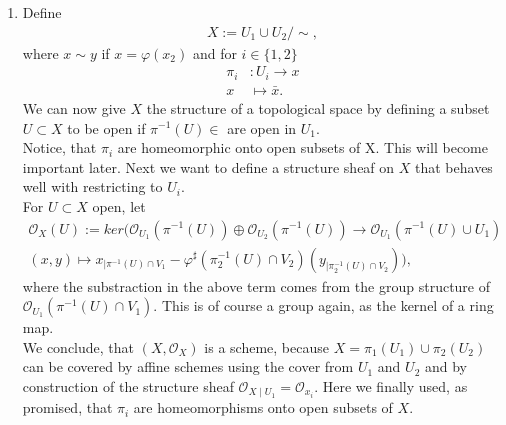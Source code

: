 \newcommand{\sheet}{5}




\maketitle{}

\begin{exercise}{1}
    \begin{enumerate}
        \item Define 
        \begin{align*}
            X:=U_1\cup U_2/\!{\sim},
        \end{align*}
        where $x\sim y$ if $x=\varphi(x_2)$ and for $i\in \lbrace
        1,2\rbrace$
        \begin{align*}
            \pi_i&:U_i\to x\\
            x&\mapsto \bar{x}.
        \end{align*}
        We can now give $X$ the structure of a topological 
        space by defining a subset $U\subset X$ to be open
        if $\pi^{-1}(U)\in$ are open in $U_1$.\\
        Notice, that $\pi_i$ are homeomorphic onto open subsets
        of X. This will become important later.
        Next we want to define a structure sheaf on $X$ that
        behaves well with restricting to $U_i.$\\
        For $U\subset X$ open, let 
        \begin{align*}
            \mathcal{O}_X(U):=ker(\mathcal{O}_{U_1}(\pi^{-1}(U))\oplus \mathcal{O}_{U_2}(\pi^{-1}(U)) \to \mathcal{O}_{U_1}(\pi^{-1}(U) \cup U_1)\\
            (x,y) \mapsto x_{\mid \pi^{-1}(U)\cap V_1}-\varphi^\sharp (\pi_2^{-1}(U)\cap V_2)(y_{\mid \pi_2^{-1}(U)\cap V_2})),
        \end{align*}
            where the substraction in the above term comes from the group
            structure of $\mathcal{O}_{U_1}(\pi^{-1}(U)\cap V_1)$. This is of course
            a group again, as the kernel of a ring map.\\
            We conclude, that $(X,\mathcal{O}_X)$ is a scheme, because 
            $X=\pi_1(U_1)\cup \pi _2(U_2)$  can be covered by affine
            schemes using the cover from $U_1$ and $U_2$ and by construction
            of the structure sheaf $\mathcal{O}_{X \mid U_1}=\mathcal{O}_{x_i}.$
            Here we finally used, as promised, that $\pi_i$ are homeomorphisms
            onto open subsets of $X$.
    \end{enumerate}
   
\end{exercise}


